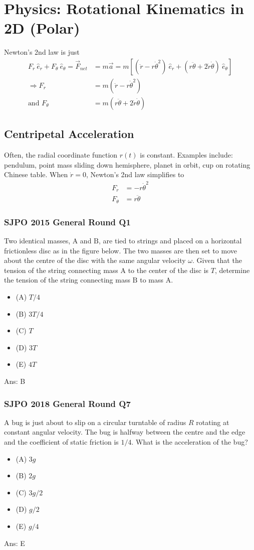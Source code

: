 \documentclass{article}
\begin{document}
\section{Physics: Rotational Kinematics in 2D (Polar)}
Newton's 2nd law is just
\begin{align}
    F_r\ \hat{e}_r + F_\theta\ \hat{e}_\theta = \vec{F}_{net} & = m \vec{a} = m \left[(\ddot{r} - r{\dot\theta}^2)\ \hat{e}_r + (r\ddot\theta + 2\dot r \dot \theta)\ \hat{e}_\theta \right]\\
    \Rightarrow F_r &= m(\ddot r - r{\dot\theta}^2) \\ 
    \text{and } F_\theta &= m (r\ddot\theta + 2 \dot r \dot \theta)  
\end{align}
\subsection{Centripetal Acceleration}
Often, the radial coordinate function $r(t)$ is constant. Examples include: pendulum, point mass sliding down hemisphere, planet in orbit, cup on rotating Chinese table. When $\dot r = 0$, Newton's 2nd law simplifies to
\begin{align}
    F_r &= -r {\dot\theta}^2 \\
    F_\theta &= r\ddot\theta
\end{align}
\subsubsection{SJPO 2015 General Round Q1}
Two identical masses, $\mathrm{A}$ and $\mathrm{B}$, are tied to strings and placed on a horizontal frictionless disc as in the figure below. The two masses are then set to move about the centre of the disc with the same angular velocity $\omega$. Given that the tension of the string connecting mass $\mathrm{A}$ to the center of the disc is $T$, determine the tension of the string connecting mass $\mathrm{B}$ to mass $\mathrm{A}$.
\begin{itemize}
\item[] (A) $T / 4$
\item[] (B) $3 T / 4$
\item[] (C) $T$
\item[] (D) $3 T$
\item[] (E) $4 T$
\end{itemize}
Ans: \ifpaper B \fi
\subsubsection{SJPO 2018 General Round Q7}
A bug is just about to slip on a circular turntable of radius $R$ rotating at constant angular velocity. The bug is halfway between the centre and the edge and the coefficient of static friction is $1 / 4$. What is the acceleration of the bug?
\begin{itemize}
\item[] (A) $3 g$
\item[] (B) $2 g$
\item[] (C) $3 g / 2$
\item[] (D) $g / 2$
\item[] (E) $g / 4$
\end{itemize}
Ans: \ifpaper E \fi
\end{document}
